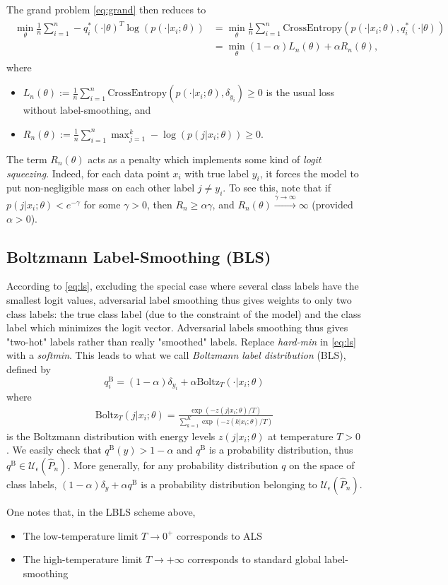 The grand problem \eqref{eq:grand} then reduces to
\begin{eqnarray}
  \begin{split}
    \min_{\theta}\frac{1}{n}\sum_{i=1}^n
    -q^*_i(\cdot|\theta)^T\log(p(\cdot|x_i;\theta))&=
    \min_{\theta}\frac{1}{n}\sum_{i=1}^n
    \text{CrossEntropy}(p(\cdot|x_i;\theta),q^*_i(\cdot|\theta))\\
    &=\min_{\theta}(1-\alpha)L_n(\theta)+\alpha R_n(\theta),
    \end{split}
\end{eqnarray}
where
\begin{itemize}
  \item $L_n(\theta) :=
    \frac{1}{n}\sum_{i=1}^n\text{CrossEntropy}(p(\cdot|x_i;\theta),\delta_{y_i}) \ge 0$ is
    the usual loss without label-smoothing, and
  \item  $R_n(\theta) := \frac{1}{n}\sum_{i=1}^n\max_{j=1}^k
    -\log(p(j|x_i;\theta)) \ge 0$.
    \end{itemize}
The term $R_n(\theta)$ acts as a penalty which implements some kind of
\textit{logit squeezing}. Indeed, for each data point $x_i$ with true label
$y_i$, it forces the model to put non-negligible mass on each other label $j \ne
y_i$. To see this, note that if $p(j|x_i;\theta) < e^{-\gamma}$ for some
$\gamma > 0$, then $R_n \ge \alpha \gamma$, and $R_n(\theta) \overset{\gamma
  \rightarrow \infty}{\longrightarrow} \infty$ (provided $\alpha > 0$).


\subsection{Boltzmann Label-Smoothing (BLS)}
According to \eqref{eq:ls}, excluding the special case where several class
labels have the smallest logit values, adversarial label smoothing thus gives
weights to only two class labels: the true class label (due to the constraint of
the model) and the class label which minimizes the logit vector. Adversarial
labels smoothing thus gives "two-hot" labels rather than really "smoothed"
labels. Replace \emph{hard-min} in \eqref{eq:ls}  with a \emph{softmin}. This
leads to what we call \emph{Boltzmann label distribution} (BLS), defined
by
$$
q^{\text{B}}_i = (1- \alpha) \delta_{y_i} + \alpha \text{Boltz}_T(\cdot|x_i;\theta)
$$
where
\begin{eqnarray}
  \text{Boltz}_T(j|x_i;\theta) = \frac{\exp(-z(j|x_i;\theta)/T)}{\sum_{k=1}^K
  \exp(-z(k|x_i;\theta)/T)}
\end{eqnarray}
is the Boltzmann distribution with energy levels $z(j|x_i;\theta)$ at
temperature $T>0$.
We easily check that $q^{\text{B}}(y) > 1- \alpha$ and $q^{\text{B}}$ is a
probability distribution, thus $q^{\text{B}} \in \mathcal
U_\epsilon(\hat{P}_n)$. More generally, for any probability distribution $q$ on
the space of class labels, $(1- \alpha) \delta_y + \alpha q^{\text{B}}$ is a probability
distribution belonging to $\mathcal U_\epsilon(\hat{P}_n)$.

One notes that, in the LBLS scheme above,
\begin{itemize}
\item The low-temperature limit $T \rightarrow 0^+$ corresponds to ALS
\item The high-temperature limit $T \rightarrow +\infty$ corresponds to standard
  global label-smoothing
\end{itemize}
